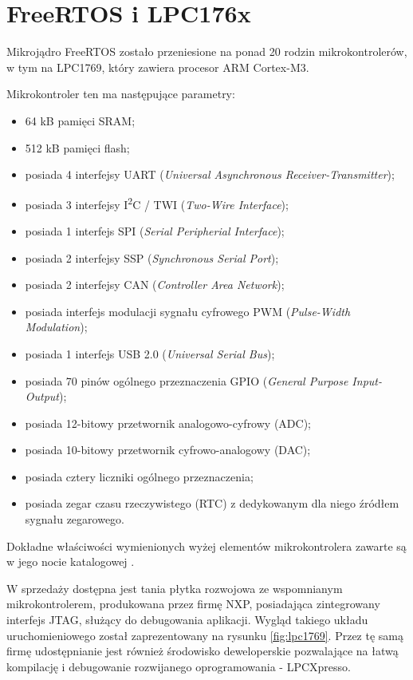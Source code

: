 \section{FreeRTOS i LPC176x}
\label{sec:rtosLPC}

Mikrojądro FreeRTOS zostało przeniesione na ponad 20 rodzin mikrokontrolerów, w tym na LPC1769, który zawiera procesor ARM Cortex-M3.

Mikrokontroler ten ma następujące parametry:
\begin{itemize}
\item 64 kB pamięci SRAM;
\item 512 kB pamięci flash;
\item posiada 4 interfejsy UART (\emph{Universal Asynchronous Receiver-Transmitter});
\item posiada 3 interfejsy I\textsuperscript{2}C / TWI (\emph{Two-Wire Interface});
\item posiada 1 interfejs SPI (\emph{Serial Peripherial Interface});
\item posiada 2 interfejsy SSP (\emph{Synchronous Serial Port});
\item posiada 2 interfejsy CAN (\emph{Controller Area Network});
\item posiada interfejs modulacji sygnału cyfrowego PWM (\emph{Pulse-Width Modulation});
\item posiada 1 interfejs USB 2.0 (\emph{Universal Serial Bus});
\item posiada 70 pinów ogólnego przeznaczenia GPIO (\emph{General Purpose Input-Output});
\item posiada 12-bitowy przetwornik analogowo-cyfrowy (ADC);
\item posiada 10-bitowy przetwornik cyfrowo-analogowy (DAC);
\item posiada cztery liczniki ogólnego przeznaczenia;
\item posiada zegar czasu rzeczywistego (RTC) z dedykowanym dla niego źródłem sygnału zegarowego.
\end{itemize}

Dokładne właściwości wymienionych wyżej elementów mikrokontrolera zawarte są w jego nocie katalogowej \cite{NXP2014}.

W sprzedaży dostępna jest tania płytka rozwojowa ze wspomnianym mikrokontrolerem, produkowana przez firmę NXP, posiadająca zintegrowany interfejs JTAG, służący do debugowania aplikacji. Wygląd takiego układu uruchomieniowego został zaprezentowany na rysunku \ref{fig:lpc1769}. Przez tę samą firmę udostępnianie jest również środowisko deweloperskie pozwalające na łatwą kompilację i debugowanie rozwijanego oprogramowania - LPCXpresso.

